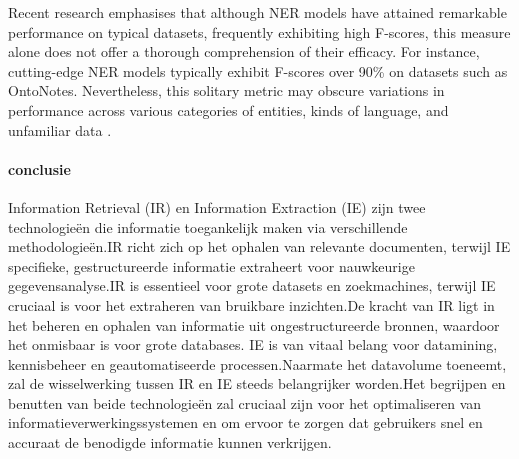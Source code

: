 \begin{itemize}
    Recent research emphasises that although NER models have attained remarkable performance on typical datasets, frequently exhibiting high F-scores, this measure alone does not offer a thorough comprehension of their efficacy. For instance, cutting-edge NER models typically exhibit F-scores over 90\% on datasets such as OntoNotes. Nevertheless, this solitary metric may obscure variations in performance across various categories of entities, kinds of language, and unfamiliar data \autocite{vajjala2022reallyknowstateart}.
    
\end{itemize}

\paragraph{conclusie}
Information Retrieval (IR) en Information Extraction (IE) zijn twee technologieën die informatie toegankelijk maken via verschillende methodologieën.IR richt zich op het ophalen van relevante documenten, terwijl IE specifieke, gestructureerde informatie extraheert voor nauwkeurige gegevensanalyse.IR is essentieel voor grote datasets en zoekmachines, terwijl IE cruciaal is voor het extraheren van bruikbare inzichten.De kracht van IR ligt in het beheren en ophalen van informatie uit ongestructureerde bronnen, waardoor het onmisbaar is voor grote databases. IE is van vitaal belang voor datamining, kennisbeheer en geautomatiseerde processen.Naarmate het datavolume toeneemt, zal de wisselwerking tussen IR en IE steeds belangrijker worden.Het begrijpen en benutten van beide technologieën zal cruciaal zijn voor het optimaliseren van informatieverwerkingssystemen en om ervoor te zorgen dat gebruikers snel en accuraat de benodigde informatie kunnen verkrijgen.

